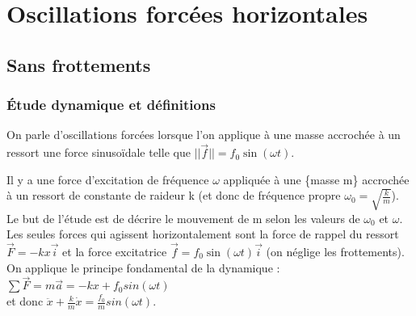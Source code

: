 \documentclass[a4paper,10pt]{book}
\begin{document}
\section{Oscillations forcées horizontales}
\subsection{Sans frottements}
\subsubsection{Étude dynamique et définitions}
On parle d'oscillations forcées lorsque l'on applique à une masse accrochée à un ressort une force sinusoïdale telle que $||\vec{f}||=f_{0}\sin(\omega t)$.\\

\begin{center}  \end{center}

Il y a une force d'excitation de fréquence $\omega$ appliquée à une \{masse m\} accrochée à un ressort de constante de raideur k (et donc de fréquence propre $\omega_{0}=\sqrt{\frac{k}{m}}$).\\

Le but de l'étude est de décrire le mouvement de m selon les valeurs de $\omega_{0}$ et $\omega$.\\

Les seules forces qui agissent horizontalement sont la force de rappel du ressort $\vec{F}=-kx\vec{i}$ et la force excitatrice $\vec{f}=f_{0}\sin(\omega t)\vec{i}$ (on néglige les frottements).\\

On applique le principe fondamental de la dynamique : $\sum \vec{F}=m\vec{a}=-kx+f_{0}sin(\omega t)$\\
et donc $\ddot{x}+\frac{k}{m}\dot{x}=\frac{f_{0}}{m}sin(\omega t)$.
\end{document}
